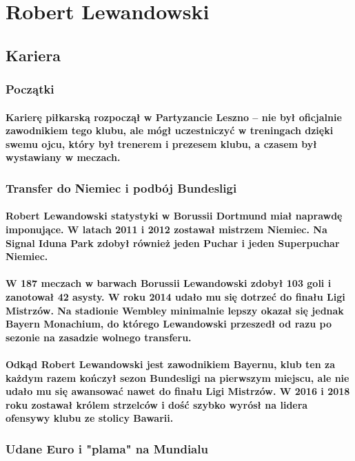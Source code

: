 \documentclass[a4paper]{article}
\begin{document}
\newpage
\section{Robert Lewandowski}
\subsection{Kariera}
\subsubsection{Początki}
\paragraph{Karierę piłkarską rozpoczął w Partyzancie Leszno – nie był oficjalnie zawodnikiem tego klubu, ale mógł uczestniczyć w treningach dzięki swemu ojcu, który był trenerem i prezesem klubu, a czasem był wystawiany w meczach.}

\subsubsection{Transfer do Niemiec i podbój Bundesligi}
\paragraph{Robert Lewandowski statystyki w Borussii Dortmund miał naprawdę imponujące. W latach 2011 i 2012 zostawał mistrzem Niemiec. Na Signal Iduna Park zdobył również jeden Puchar i jeden Superpuchar Niemiec.}
\paragraph{W 187 meczach w barwach Borussii Lewandowski zdobył 103 goli i zanotował 42 asysty. W roku 2014 udało mu się dotrzeć do finału Ligi Mistrzów. Na stadionie Wembley minimalnie lepszy okazał się jednak Bayern Monachium, do którego Lewandowski przeszedł od razu po sezonie na zasadzie wolnego transferu.}
\paragraph{Odkąd Robert Lewandowski jest zawodnikiem Bayernu, klub ten za każdym razem kończył sezon Bundesligi na pierwszym miejscu, ale nie udało mu się awansować nawet do finału Ligi Mistrzów. W 2016 i 2018 roku zostawał królem strzelców i dość szybko wyrósł na lidera ofensywy klubu ze stolicy Bawarii.}

\subsubsection{Udane Euro i "plama" na Mundialu}
\end{document}

